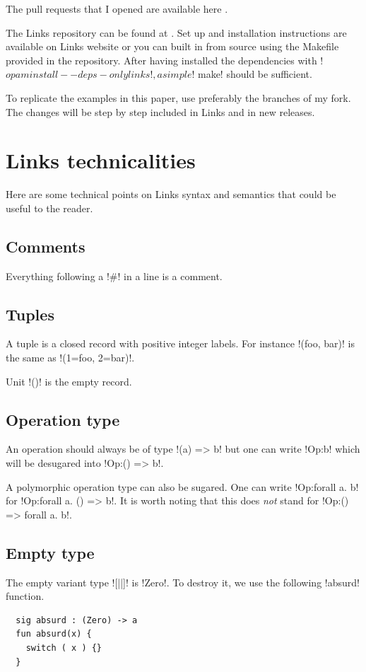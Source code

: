 \documentclass[10pt, nonacm=true, language=french, language=english]{acmart}
\begin{document}
The pull requests that I opened are available here \cite{gh:prs}.

The Links repository can be found at \cite{gh:links}. Set up and installation instructions are available on Links website \cite{links-org} or you can built in from source using the Makefile provided in the repository. After having installed the dependencies with !$ opam install --deps-only links!, a simple !$ make! should be sufficient.

To replicate the examples in this paper, use preferably the branches of my fork. The changes will be step by step included in Links and in new releases.


\section{Links technicalities}
\label{sec:tech}

Here are some technical points on Links syntax and semantics that could be useful to the reader.

\subsection{Comments}
\label{sec:comments}
Everything following a !#! in a line is a comment.

\subsection{Tuples}
\label{sec:tuples}
A tuple is a closed record with positive integer labels. For instance !(foo, bar)! is the same as !(1=foo, 2=bar)!.

Unit !()! is the empty record.


\subsection{Operation type}
\label{sec:operation-type}
An operation should always be of type !(a) => b! but one can write !Op:b! which will be desugared into !Op:() => b!.

A polymorphic operation type can also be sugared. One can write !Op:forall a. b! for !Op:forall a. () => b!. It is worth noting that this does \emph{not} stand for !Op:() => forall a. b!.

\subsection{Empty type}
\label{sec:tech:zero}
The empty variant type ![||]! is !Zero!. To destroy it, we use the following !absurd! function.
\begin{lstlisting}
  sig absurd : (Zero) -> a
  fun absurd(x) {
    switch ( x ) {}
  }
\end{lstlisting}
\end{document}
